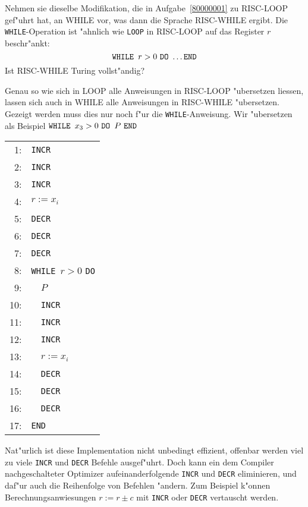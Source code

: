Nehmen sie dieselbe Modifikation, die in Aufgabe~\ref{80000001}
zu RISC-LOOP gef"uhrt hat,
an WHILE vor, was dann die Sprache RISC-WHILE ergibt. Die {\tt WHILE}-Operation
ist "ahnlich wie {\tt LOOP} in RISC-LOOP auf das Register $r$ beschr"ankt:
\[
\text{\tt WHILE }r>0\text{ \tt DO} \dots { \tt END}
\]
Ist RISC-WHILE Turing vollst"andig?

\begin{loesung}
Genau so wie sich in LOOP alle Anweisungen in RISC-LOOP "ubersetzen
liessen, lassen sich auch in WHILE alle Anweisungen in RISC-WHILE
"ubersetzen. Gezeigt werden muss dies nur noch f"ur die {\tt WHILE}-Anweisung.
Wir "ubersetzen als Beispiel $\text{\tt WHILE }x_3 > 0\text{ \tt DO }P \text{ \tt END}$
\begin{center}
\begin{tabular}{r<{:}l}
 1& {\tt INCR}\\
 2& {\tt INCR}\\
 3& {\tt INCR}\\
 4& $r:=x_i$\\
 5& {\tt DECR}\\
 6& {\tt DECR}\\
 7& {\tt DECR}\\
 8& {\tt WHILE }$r > 0$ { \tt DO}\\
 9& {\tt \ \ }$P$\\
10& {\tt \ \ INCR}\\
11& {\tt \ \ INCR}\\
12& {\tt \ \ INCR}\\
13& {\tt \ \ }$r:=x_i$\\
14& {\tt \ \ DECR}\\
15& {\tt \ \ DECR}\\
16& {\tt \ \ DECR}\\
17& {\tt END}
\end{tabular}
\end{center}
Nat"urlich ist diese Implementation nicht unbedingt effizient, offenbar werden
viel zu viele {\tt INCR} und {\tt DECR} Befehle ausgef"uhrt. Doch kann ein
dem Compiler nachgeschalteter Optimizer aufeinanderfolgende {\tt INCR} und
{\tt DECR} eliminieren, und daf"ur auch die Reihenfolge von Befehlen "andern.
Zum Beispiel k"onnen Berechnungsanwiesungen $r:= r\pm c$ mit {\tt INCR}
oder {\tt DECR} vertauscht werden.
\end{loesung}

